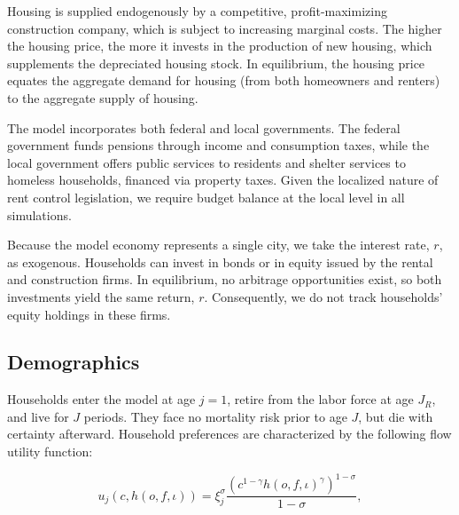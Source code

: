 \documentclass[parskip=full]{article}
\begin{document}
Housing is supplied endogenously by a competitive, profit-maximizing construction company, which is subject to increasing marginal costs. The higher the housing price, the more it invests in the production of new housing, which supplements the depreciated housing stock. In equilibrium, the housing price equates the aggregate demand for housing (from both homeowners and renters) to the aggregate supply of housing.

The model incorporates both federal and local governments. The federal government funds pensions through income and consumption taxes, while the local government offers public services to residents and shelter services to homeless households, financed via property taxes. Given the localized nature of rent control legislation, we require budget balance at the local level in all simulations.

Because the model economy represents a single city, we take the interest rate, $r$, as exogenous. Households can invest in bonds or in equity issued by the rental and construction firms. In equilibrium, no arbitrage opportunities exist, so both investments yield the same return, $r$. Consequently, we do not track households' equity holdings in these firms. 

\subsection{Demographics}\label{subsection:demographics}

Households enter the model at age $j=1$, retire from the labor force at age $J_{R}$, and live for $J$ periods. They face no mortality risk prior to age $J$, but die with certainty afterward. Household preferences are characterized by the following flow utility function:

\begin{equation*}
    u_{j}(c,h(o,f,\iota))=\xi_{j}^{\sigma}\frac{\left(c^{1-\gamma} h(o,f,\iota)^{\gamma}\right)^{1-\sigma}}{1-\sigma},
\end{equation*}
\end{document}
